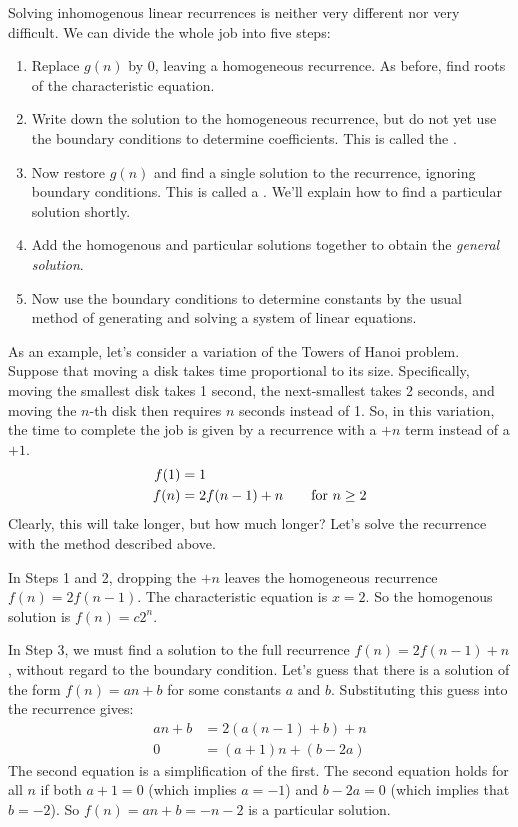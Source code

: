 Solving inhomogenous linear recurrences is neither very different nor
very difficult. We can divide the whole job into five steps:

\begin{enumerate}

\item Replace $g(n)$ by 0, leaving a homogeneous recurrence.  As
  before, find roots of the characteristic equation.

\item Write down the solution to the homogeneous recurrence, but do
  not yet use the boundary conditions to determine coefficients.  This
  is called the .

\item Now restore $g(n)$ and find a single solution to the recurrence,
  ignoring boundary conditions.  This is called a .  We'll explain how to find a particular solution
  shortly.

\item Add the homogenous and particular solutions together to obtain
  the \emph{general solution}.

\item Now use the boundary conditions to determine constants by the
  usual method of generating and solving a system of linear equations.

\end{enumerate}

As an example, let's consider a variation of the Towers of Hanoi
problem.  Suppose that moving a disk takes time proportional to its
size.  Specifically, moving the smallest disk takes 1 second, the
next-smallest takes 2 seconds, and moving the $n$-th disk then
requires $n$ seconds instead of 1.  So, in this variation, the time to
complete the job is given by a recurrence with a $+n$ term instead of
a $+1$.
\begin{align*}
f(1) & = 1 \\
f(n) & = 2 f(n - 1) + n \text{\qquad for $n \geq 2$}
\end{align*}
Clearly, this will take longer, but how much longer?  Let's solve the
recurrence with the method described above.

In Steps 1 and 2, dropping the $+n$ leaves the homogeneous recurrence
$f(n) = 2 f(n -1)$.  The characteristic equation is $x = 2$.  So the
homogenous solution is $f(n) = c2^n$.

In Step 3, we must find a solution to the full recurrence $f(n) = 2
f(n - 1) + n$, without regard to the boundary condition.  Let's guess
that there is a solution of the form $f(n) = a n + b$ for some
constants $a$ and $b$.  Substituting this guess into the recurrence
gives:
\begin{align*}
a n + b & = 2 (a (n - 1) + b) + n \\
0 & = (a + 1) n + (b - 2 a)
\end{align*}
The second equation is a simplification of the first.  The second
equation holds for all $n$ if both $a + 1 = 0$ (which implies $a =
-1$) and $b - 2a = 0$ (which implies that $b = -2$).  So $f(n) = an +
b = -n - 2$ is a particular solution.

